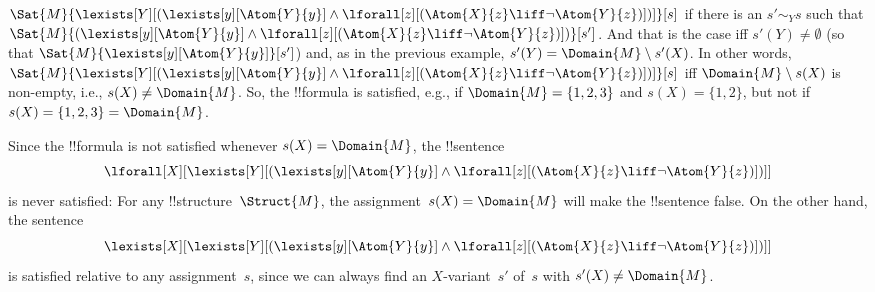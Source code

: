 \documentclass[../../../include/open-logic-section]{subfiles}
\begin{document}
\begin{ex}
$\Sat{M}{\lexists[Y][(\lexists[y][\Atom{Y}{y}] \land
      \lforall[z][(\Atom{X}{z} \liff \lnot \Atom{Y}{z})])]}[s]$ if
  there is an $s' \sim_Y s$ such that
  $\Sat{M}{(\lexists[y][\Atom{Y}{y}] \land \lforall[z][(\Atom{X}{z}
      \liff \lnot \Atom{Y}{z})])}[s']$. And that is the case iff $s'(Y)
  \neq \emptyset$ (so that $\Sat{M}{\lexists[y][\Atom{Y}{y}]}[s']$)
  and, as in the previous example, $s'(Y) = \Domain{M} \setminus
  s'(X)$. In other words,
  $\Sat{M}{\lexists[Y][(\lexists[y][\Atom{Y}{y}] \land
      \lforall[z][(\Atom{X}{z} \liff \lnot \Atom{Y}{z})])]}[s]$ iff
  $\Domain{M} \setminus s(X)$ is non-empty, i.e., $s(X) \neq
  \Domain{M}$. So, the !!{formula} is satisfied, e.g., if $\Domain{M}
  = \{1, 2, 3\}$ and $s(X) = \{1, 2\}$, but not if $s(X) = \{1, 2, 3\}
  = \Domain{M}$.

  Since the !!{formula} is not satisfied whenever $s(X) = \Domain{M}$,
  the !!{sentence}
  \[
  \lforall[X][\lexists[Y][(\lexists[y][\Atom{Y}{y}] \land
      \lforall[z][(\Atom{X}{z} \liff \lnot \Atom{Y}{z})])]]
  \]
  is never satisfied: For any !!{structure}~$\Struct{M}$, the
  assignment~$s(X) = \Domain{M}$ will make the !!{sentence} false. On
  the other hand, the sentence
  \[
  \lexists[X][\lexists[Y][(\lexists[y][\Atom{Y}{y}] \land
      \lforall[z][(\Atom{X}{z} \liff \lnot \Atom{Y}{z})])]]
  \]
  is satisfied relative to any assignment~$s$, since we can always
  find an $X$-variant~$s'$ of~$s$ with $s'(X) \neq \Domain{M}$.
\end{ex}
\end{document}
